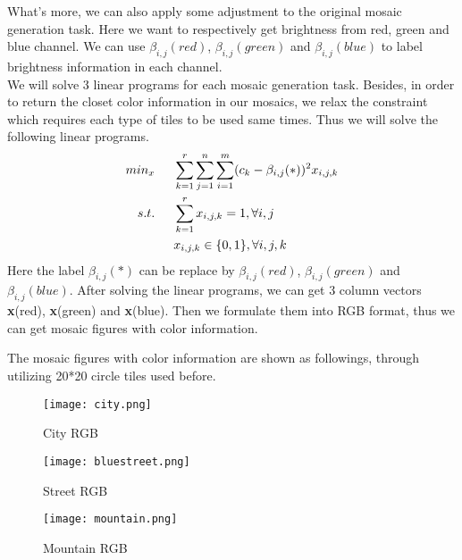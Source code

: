 \documentclass[12pt,a4paper]{article}
\begin{document}
\par What's more, we can also apply some adjustment to the original mosaic generation task. Here we want to respectively get brightness from red, green and blue channel. We can use $\beta_{i,j}(red)$, $\beta_{i,j}(green)$ and $\beta_{i,j}(blue)$ to label brightness information in each channel.\\
\indent We will solve 3 linear programs for each mosaic generation task. Besides, in order to return the closet color information in our mosaics, we relax the constraint which requires each type of tiles to be used same times. Thus we will solve the following linear programs.
\begin{equation*}
\begin{aligned}
min_{x}\indent& \sum_{k=1}^{r}\sum_{j=1}^{n}\sum_{i=1}^{m}(c_{k}-\beta_{i,j}(*))^{2}x_{i,j,k}\\
s.t.\indent& \sum_{k=1}^{r}x_{i,j,k}=1, \forall i,j\\
&  x_{i,j,k} \in \{0,1\}, \forall i,j,k
\end{aligned}
\end{equation*}
Here the label $\beta_{i,j}(*)$ can be replace by $\beta_{i,j}(red)$, $\beta_{i,j}(green)$ and $\beta_{i,j}(blue)$. After solving the linear programs, we can get 3 column vectors \textbf{x}(red), \textbf{x}(green) and \textbf{x}(blue). Then we formulate them into RGB format, thus we can get mosaic figures with color information.\\

\par The mosaic figures with color information are shown as followings, through utilizing 20*20 circle tiles used before.
\begin{figure}[htbp]
	\centering
	\begin{minipage}[t]{0.32\linewidth}
		\centering
		\texttt{[image: city.png]}
		\caption{City RGB}
	\end{minipage}
	\begin{minipage}[t]{0.32\linewidth}
		\centering
		\texttt{[image: bluestreet.png]}
		\caption{Street RGB}
	\end{minipage}
	\begin{minipage}[t]{0.32\linewidth}
		\centering
		\texttt{[image: mountain.png]}
		\caption{Mountain RGB}
	\end{minipage}                        
\end{figure}
\end{document}
